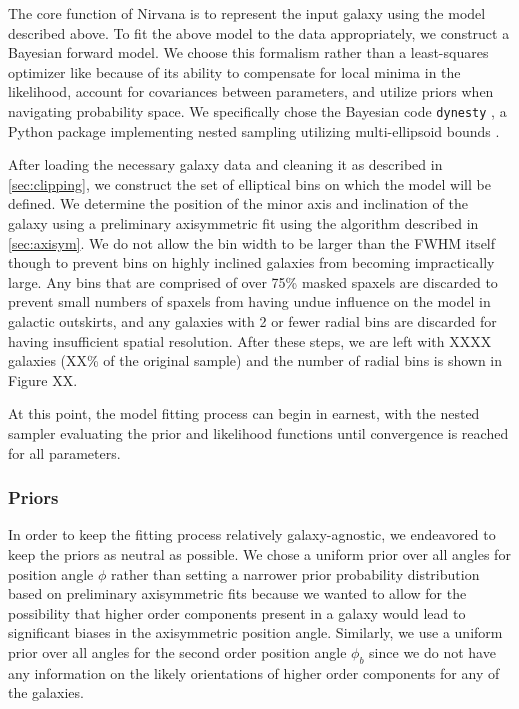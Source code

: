 The core function of Nirvana is to represent the input galaxy using the model described above. To fit the above model to the data appropriately, we construct a Bayesian forward model. We choose this formalism rather than a least-squares optimizer like \citep{spekkens07} because of its ability to compensate for local minima in the likelihood, account for covariances between parameters, and utilize priors when navigating probability space. We specifically chose the Bayesian code \texttt{dynesty} \citep{dynesty}, a Python package implementing nested sampling \citep{skilling04, skilling06} utilizing multi-ellipsoid bounds \citep{feroz09}.

After loading the necessary galaxy data and cleaning it as described in \ref{sec:clipping}, we construct the set of elliptical bins on which the model will be defined. We determine the position of the minor axis and inclination of the galaxy using a preliminary axisymmetric fit using the algorithm described in \ref{sec:axisym}. We do not allow the bin width to be larger than the FWHM itself though to prevent bins on highly inclined galaxies from becoming impractically large. Any bins that are comprised of over 75\% masked spaxels are discarded to prevent small numbers of spaxels from having undue influence on the model in galactic outskirts, and any galaxies with 2 or fewer radial bins are discarded for having insufficient spatial resolution. After these steps, we are left with XXXX galaxies (XX\% of the original sample) and the number of radial bins is shown in Figure XX. 

At this point, the model fitting process can begin in earnest, with the nested sampler evaluating the prior and likelihood functions until convergence is reached for all parameters. 

\subsubsection{Priors} \label{sec:priors}
In order to keep the fitting process relatively galaxy-agnostic, we endeavored to keep the priors as neutral as possible. We chose a uniform prior over all angles for position angle $\phi$ rather than setting a narrower prior probability distribution based on preliminary axisymmetric fits because we wanted to allow for the possibility that higher order components present in a galaxy would lead to significant biases in the axisymmetric position angle. Similarly, we use a uniform prior over all angles for the second order position angle $\phi_b$ since we do not have any information on the likely orientations of higher order components for any of the galaxies. 

